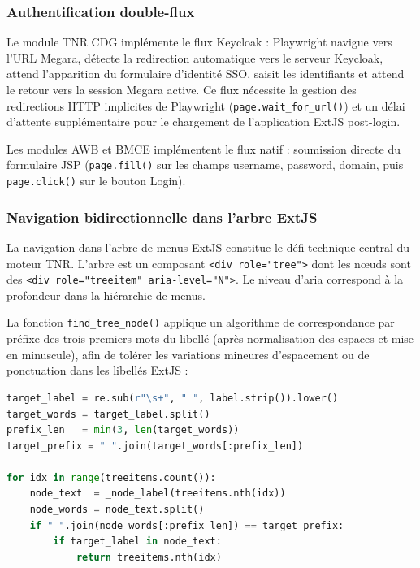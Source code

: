 \documentclass[12pt, a4paper]{report}
\begin{document}
\subsubsection{Authentification double-flux}

Le module TNR CDG implémente le flux Keycloak : Playwright navigue vers l'URL Megara, détecte la redirection automatique vers le serveur Keycloak, attend l'apparition du formulaire d'identité SSO, saisit les identifiants et attend le retour vers la session Megara active. Ce flux nécessite la gestion des redirections HTTP implicites de Playwright (\texttt{page.wait\_for\_url()}) et un délai d'attente supplémentaire pour le chargement de l'application ExtJS post-login.

Les modules AWB et BMCE implémentent le flux natif : soumission directe du formulaire JSP (\texttt{page.fill()} sur les champs username, password, domain, puis \texttt{page.click()} sur le bouton Login).

\subsubsection{Navigation bidirectionnelle dans l'arbre ExtJS}

La navigation dans l'arbre de menus ExtJS constitue le d\'{e}fi technique central du moteur TNR. L'arbre est un composant \texttt{<div role="tree">} dont les nœuds sont des \texttt{<div role="treeitem" aria-level="N">}. Le niveau d'aria correspond à la profondeur dans la hiérarchie de menus.

La fonction \texttt{find\_tree\_node()} applique un algorithme de correspondance par préfixe des trois premiers mots du libellé (après normalisation des espaces et mise en minuscule), afin de tolérer les variations mineures d'espacement ou de ponctuation dans les libellés ExtJS :

\begin{mdframed}[backgroundcolor=codeGray, linewidth=0pt, innerleftmargin=8pt]
\begin{lstlisting}[language=Python, basicstyle=\ttfamily\scriptsize]
target_label = re.sub(r"\s+", " ", label.strip()).lower()
target_words = target_label.split()
prefix_len   = min(3, len(target_words))
target_prefix = " ".join(target_words[:prefix_len])

for idx in range(treeitems.count()):
    node_text  = _node_label(treeitems.nth(idx))
    node_words = node_text.split()
    if " ".join(node_words[:prefix_len]) == target_prefix:
        if target_label in node_text:
            return treeitems.nth(idx)
\end{lstlisting}
\end{mdframed}
\end{document}
